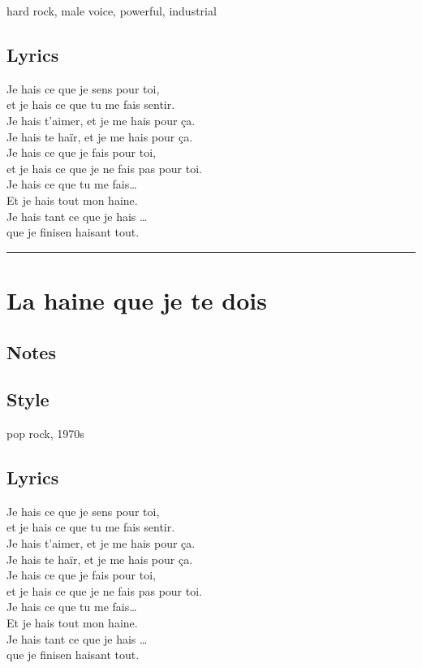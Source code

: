 hard rock, male voice, powerful, industrial

\subsection{Lyrics}\label{lyrics-5}

Je hais ce que je sens pour toi,\\
et je hais ce que tu me fais sentir.\\
Je hais t'aimer, et je me hais pour ça.\\
Je hais te haïr, et je me hais pour ça.\\
Je hais ce que je fais pour toi,\\
et je hais ce que je ne fais pas pour toi.\\
Je hais ce que tu me fais\ldots{}\\
Et je hais tout mon haine.\\
Je hais tant ce que je hais \ldots{}\\
que je finisen haisant tout.

\begin{center}\rule{0.5\linewidth}{0.5pt}\end{center}

\section{La haine que je te dois}\label{la-haine-que-je-te-dois}

\subsection{Notes}\label{notes-7}

\subsection{Style}\label{style-6}

pop rock, 1970s

\subsection{Lyrics}\label{lyrics-6}

Je hais ce que je sens pour toi,\\
et je hais ce que tu me fais sentir.\\
Je hais t'aimer, et je me hais pour ça.\\
Je hais te haïr, et je me hais pour ça.\\
Je hais ce que je fais pour toi,\\
et je hais ce que je ne fais pas pour toi.\\
Je hais ce que tu me fais\ldots{}\\
Et je hais tout mon haine.\\
Je hais tant ce que je hais \ldots{}\\
que je finisen haisant tout.

